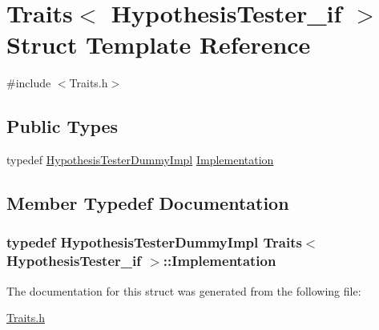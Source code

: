 \hypertarget{struct_traits_3_01_hypothesis_tester__if_01_4}{}\section{Traits$<$ Hypothesis\+Tester\+\_\+if $>$ Struct Template Reference}
\label{struct_traits_3_01_hypothesis_tester__if_01_4}


{\ttfamily \#include $<$Traits.\+h$>$}

\subsection*{Public Types}
\begin{DoxyCompactItemize}
\item 
typedef \hyperlink{class_hypothesis_tester_dummy_impl}{Hypothesis\+Tester\+Dummy\+Impl} \hyperlink{struct_traits_3_01_hypothesis_tester__if_01_4_a65949676bbafd6f51929afb1890b75f9}{Implementation}
\end{DoxyCompactItemize}


\subsection{Member Typedef Documentation}
\subsubsection[{\texorpdfstring{Implementation}{Implementation}}]{\setlength{\rightskip}{0pt plus 5cm}typedef {\bf Hypothesis\+Tester\+Dummy\+Impl} {\bf Traits}$<$ {\bf Hypothesis\+Tester\+\_\+if} $>$\+::{\bf Implementation}}\hypertarget{struct_traits_3_01_hypothesis_tester__if_01_4_a65949676bbafd6f51929afb1890b75f9}{}\label{struct_traits_3_01_hypothesis_tester__if_01_4_a65949676bbafd6f51929afb1890b75f9}


The documentation for this struct was generated from the following file\+:\begin{DoxyCompactItemize}
\item 
\hyperlink{_traits_8h}{Traits.\+h}\end{DoxyCompactItemize}
